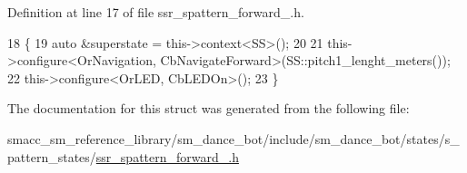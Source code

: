 Definition at line 17 of file ssr\+\_\+spattern\+\_\+forward\+\_.\+h.


\begin{DoxyCode}
18   \{
19     \textcolor{keyword}{auto} &superstate = this->context<SS>();
20 
21     this->configure<OrNavigation, CbNavigateForward>(SS::pitch1\_lenght\_meters());
22     this->configure<OrLED, CbLEDOn>();
23   \}
\end{DoxyCode}


The documentation for this struct was generated from the following file\+:\begin{DoxyCompactItemize}
\item 
smacc\+\_\+sm\+\_\+reference\+\_\+library/sm\+\_\+dance\+\_\+bot/include/sm\+\_\+dance\+\_\+bot/states/s\+\_\+pattern\+\_\+states/\hyperlink{ssr__spattern__forward__2_8h}{ssr\+\_\+spattern\+\_\+forward\+\_.\+h}\end{DoxyCompactItemize}
